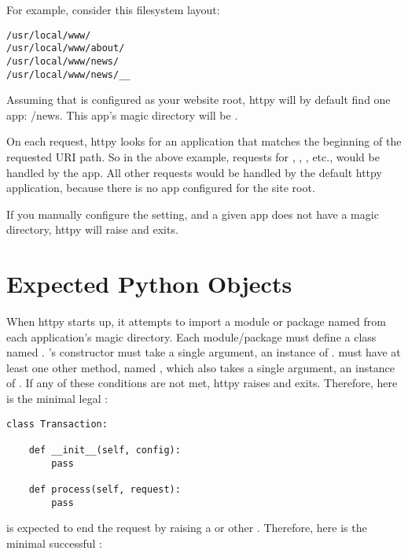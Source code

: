 For example, consider this filesystem layout:

\begin{verbatim}
/usr/local/www/
/usr/local/www/about/
/usr/local/www/news/
/usr/local/www/news/__
\end{verbatim}

Assuming that  is configured as your website root, httpy
will by default find one app: /news. This app's magic directory will be
.

On each request, httpy looks for an application that matches the beginning of
the requested URI path. So in the above example, requests for ,
, , etc., would be handled by the
 app. All other requests would be handled by the default httpy
application, because there is no app configured for the site root.

If you manually configure the  setting, and a given app does not have
a magic directory, httpy will raise  and exits.



\section{Expected Python Objects}

When httpy starts up, it attempts to import a module or package named
 from each application's magic directory. Each 
module/package must define a class named .
's constructor must take a single argument, an instance of
.  must have at least one other method,
named , which also takes a single argument, an instance of
. If any of these conditions are not met, httpy raises
 and exits. Therefore, here is the minimal legal
:

\begin{verbatim}
class Transaction:

    def __init__(self, config):
        pass

    def process(self, request):
        pass

\end{verbatim}

 is expected to end the request by raising a
 or other . Therefore, here is the minimal
successful :

